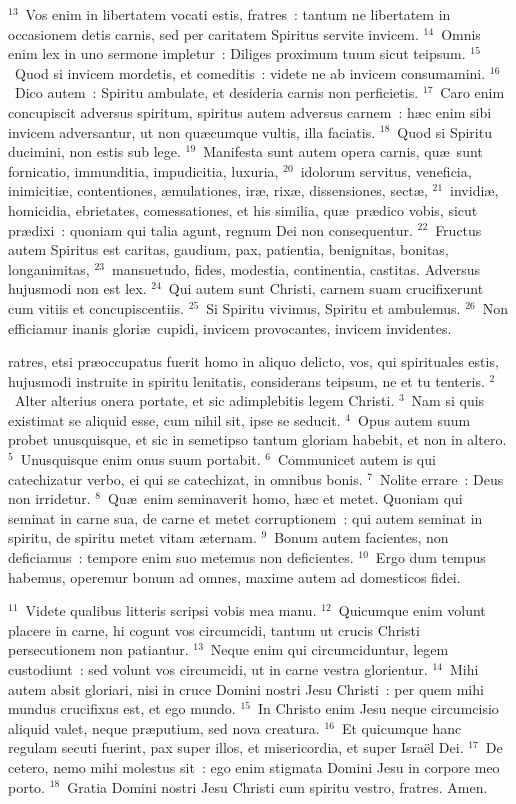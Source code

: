 ${}^{13}$~Vos enim in libertatem vocati estis, fratres~: tantum ne libertatem in occasionem detis carnis, sed per caritatem Spiritus servite invicem.
${}^{14}$~Omnis enim lex in uno sermone impletur~: Diliges proximum tuum sicut teipsum.
${}^{15}$~Quod si invicem mordetis, et comeditis~: videte ne ab invicem consumamini.
${}^{16}$~Dico autem~: Spiritu ambulate, et desideria carnis non perficietis.
${}^{17}$~Caro enim concupiscit adversus spiritum, spiritus autem adversus carnem~: h\ae c enim sibi invicem adversantur, ut non qu\ae cumque vultis, illa faciatis.
${}^{18}$~Quod si Spiritu ducimini, non estis sub lege.
${}^{19}$~Manifesta sunt autem opera carnis, qu\ae\ sunt fornicatio, immunditia, impudicitia, luxuria,
${}^{20}$~idolorum servitus, veneficia, inimiciti\ae , contentiones, \ae mulationes, ir\ae , rix\ae , dissensiones, sect\ae ,
${}^{21}$~invidi\ae , homicidia, ebrietates, comessationes, et his similia, qu\ae\ pr\ae dico vobis, sicut pr\ae dixi~: quoniam qui talia agunt, regnum Dei non consequentur.
${}^{22}$~Fructus autem Spiritus est caritas, gaudium, pax, patientia, benignitas, bonitas, longanimitas,
${}^{23}$~mansuetudo, fides, modestia, continentia, castitas. Adversus hujusmodi non est lex.
${}^{24}$~Qui autem sunt Christi, carnem suam crucifixerunt cum vitiis et concupiscentiis.
${}^{25}$~Si Spiritu vivimus, Spiritu et ambulemus.
${}^{26}$~Non efficiamur inanis glori\ae\ cupidi, invicem provocantes, invicem invidentes.

\bchapter
{}ratres, etsi pr\ae occupatus fuerit homo in aliquo delicto, vos, qui spirituales estis, hujusmodi instruite in spiritu lenitatis, considerans teipsum, ne et tu tenteris.
${}^{2}$~Alter alterius onera portate, et sic adimplebitis legem Christi.
${}^{3}$~Nam si quis existimat se aliquid esse, cum nihil sit, ipse se seducit.
${}^{4}$~Opus autem suum probet unusquisque, et sic in semetipso tantum gloriam habebit, et non in altero.
${}^{5}$~Unusquisque enim onus suum portabit.
${}^{6}$~Communicet autem is qui catechizatur verbo, ei qui se catechizat, in omnibus bonis.
${}^{7}$~Nolite errare~: Deus non irridetur.
${}^{8}$~Qu\ae\ enim seminaverit homo, h\ae c et metet. Quoniam qui seminat in carne sua, de carne et metet corruptionem~: qui autem seminat in spiritu, de spiritu metet vitam \ae ternam.
${}^{9}$~Bonum autem facientes, non deficiamus~: tempore enim suo metemus non deficientes.
${}^{10}$~Ergo dum tempus habemus, operemur bonum ad omnes, maxime autem ad domesticos fidei.


${}^{11}$~Videte qualibus litteris scripsi vobis mea manu.
${}^{12}$~Quicumque enim volunt placere in carne, hi cogunt vos circumcidi, tantum ut crucis Christi persecutionem non patiantur.
${}^{13}$~Neque enim qui circumciduntur, legem custodiunt~: sed volunt vos circumcidi, ut in carne vestra glorientur.
${}^{14}$~Mihi autem absit gloriari, nisi in cruce Domini nostri Jesu Christi~: per quem mihi mundus crucifixus est, et ego mundo.
${}^{15}$~In Christo enim Jesu neque circumcisio aliquid valet, neque pr\ae putium, sed nova creatura.
${}^{16}$~Et quicumque hanc regulam secuti fuerint, pax super illos, et misericordia, et super Isra\"el Dei.
${}^{17}$~De cetero, nemo mihi molestus sit~: ego enim stigmata Domini Jesu in corpore meo porto.
${}^{18}$~Gratia Domini nostri Jesu Christi cum spiritu vestro, fratres. Amen.
